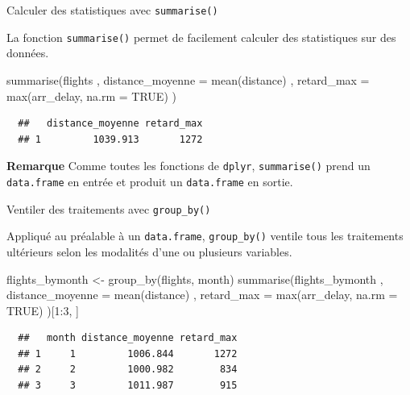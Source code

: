 \documentclass[12pt,handout,ignorenonframetext,]{beamer}
\newenvironment{Shaded}{}{}
\newcommand{\KeywordTok}[1]{\textcolor[rgb]{0.00,0.00,1.00}{{#1}}}
\newcommand{\DataTypeTok}[1]{{#1}}
\newcommand{\DecValTok}[1]{{#1}}
\newcommand{\StringTok}[1]{\textcolor[rgb]{0.00,0.50,0.50}{{#1}}}
\newcommand{\OtherTok}[1]{\textcolor[rgb]{1.00,0.25,0.00}{{#1}}}
\newcommand{\NormalTok}[1]{{#1}}
\renewenvironment{Shaded}{\begin{snugshade}}{\end{snugshade}}
\begin{document}
\begin{frame}[fragile]{Calculer des statistiques avec
\texttt{summarise()}}

La fonction \texttt{summarise()} permet de facilement calculer des
statistiques sur des données.

\pause 

\begin{Shaded}
\begin{Highlighting}[]
\KeywordTok{summarise}\NormalTok{(flights}
  \NormalTok{, }\DataTypeTok{distance_moyenne =} \KeywordTok{mean}\NormalTok{(distance)}
  \NormalTok{, }\DataTypeTok{retard_max =} \KeywordTok{max}\NormalTok{(arr_delay, }\DataTypeTok{na.rm =} \OtherTok{TRUE}\NormalTok{)}
\NormalTok{)}
\end{Highlighting}
\end{Shaded}

\begin{verbatim}
  ##   distance_moyenne retard_max
  ## 1         1039.913       1272
\end{verbatim}

\pause 

\textbf{Remarque} Comme toutes les fonctions de \texttt{dplyr},
\texttt{summarise()} prend un \texttt{data.frame} en entrée et produit
un \texttt{data.frame} en sortie.

\end{frame}

\begin{frame}[fragile]{Ventiler des traitements avec
\texttt{group\_by()}}

Appliqué au préalable à un \texttt{data.frame}, \texttt{group\_by()}
ventile tous les traitements ultérieurs selon les modalités d'une ou
plusieurs variables.

\begin{Shaded}
\begin{Highlighting}[]
\NormalTok{flights_bymonth <-}\StringTok{ }\KeywordTok{group_by}\NormalTok{(flights, month)}
\KeywordTok{summarise}\NormalTok{(flights_bymonth}
  \NormalTok{, }\DataTypeTok{distance_moyenne =} \KeywordTok{mean}\NormalTok{(distance)}
  \NormalTok{, }\DataTypeTok{retard_max =} \KeywordTok{max}\NormalTok{(arr_delay, }\DataTypeTok{na.rm =} \OtherTok{TRUE}\NormalTok{)}
\NormalTok{)[}\DecValTok{1}\NormalTok{:}\DecValTok{3}\NormalTok{, ]}
\end{Highlighting}
\end{Shaded}

\begin{verbatim}
  ##   month distance_moyenne retard_max
  ## 1     1         1006.844       1272
  ## 2     2         1000.982        834
  ## 3     3         1011.987        915
\end{verbatim}

\end{frame}
\end{document}

